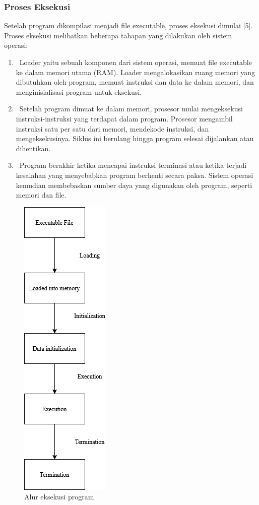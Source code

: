 \subsubsection{Proses Eksekusi}
Setelah program dikompilasi menjadi file executable, proses eksekusi dimulai [5]. Proses eksekusi melibatkan beberapa tahapan yang dilakukan oleh sistem operasi:
\begin{enumerate}
	\item {} Loader yaitu sebuah komponen dari sistem operasi, memuat file executable ke dalam memori utama (RAM). Loader mengalokasikan ruang memori yang dibutuhkan oleh program, memuat instruksi dan data ke dalam memori, dan menginisialisasi program untuk eksekusi.
	\item {} Setelah program dimuat ke dalam memori, prosesor mulai mengeksekusi instruksi-instruksi yang terdapat dalam program. Prosesor mengambil instruksi satu per satu dari memori, mendekode instruksi, dan mengeksekusinya. Siklus ini berulang hingga program selesai dijalankan atau dihentikan.
	\item {} Program berakhir ketika mencapai instruksi terminasi atau ketika terjadi kesalahan yang menyebabkan program berhenti secara paksa. Sistem operasi kemudian membebaskan sumber daya yang digunakan oleh program, seperti memori dan file.
\end{enumerate}

\begin{figure}
	\centering
	\includegraphics[height=0.5\textheight]
	{assets/pics/program_execution.png}
	\caption{Alur eksekusi program}
\end{figure}

